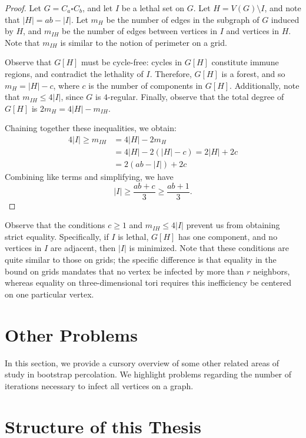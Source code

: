 \begin{proof}
Let $G = C_a \square C_b$, and let $I$ be a lethal set on $G$. Let $H = V(G) \setminus I$, and note that $|H| = ab - |I|$. Let $m_{H}$ be the number of edges in the subgraph of $G$ induced by $H$, and $m_{IH}$ be the number of edges between vertices in $I$ and vertices in $H$. Note that $m_{IH}$ is similar to the notion of perimeter on a grid.

Observe that $G[H]$ must be cycle-free: cycles in $G[H]$ constitute immune regions, and contradict the lethality of $I$. Therefore, $G[H]$ is a forest, and so $m_H = |H| - c$, where $c$ is the number of components in $G[H]$. Additionally, note that $m_{IH} \leq 4|I|$, since $G$ is $4$-regular. Finally, observe that the total degree of $G[H]$ is $2m_H = 4|H| - m_{IH}$.

Chaining together these inequalities, we obtain:
\begin{align*}
4|I| \geq m_{IH} &= 4|H| - 2m_H \\
&= 4|H| - 2(|H| -c) = 2|H| + 2c \\
&= 2(ab-|I|) + 2c
\end{align*}
Combining like terms and simplifying, we have
$$|I| \geq \frac{ab +c}{3} \geq \frac{ab +1}{3}.$$
\end{proof}

Observe that the conditions $c \geq 1$ and $m_{IH} \leq 4|I|$ prevent us from obtaining strict equality. Specifically, if $I$ is lethal, $G[H]$ has one component, and no vertices in $I$ are adjacent, then $|I|$ is minimized. Note that these conditions are quite similar to those on grids; the specific difference is that equality in the bound on grids mandates that no vertex be infected by more than $r$ neighbors, whereas equality on three-dimensional tori requires this inefficiency be centered on one particular vertex. 

\section{Other Problems}

In this section, we provide a cursory overview of some other related areas of study in bootstrap percolation. We highlight problems regarding the number of iterations necessary to infect all vertices on a graph.

\section{Structure of this Thesis}

